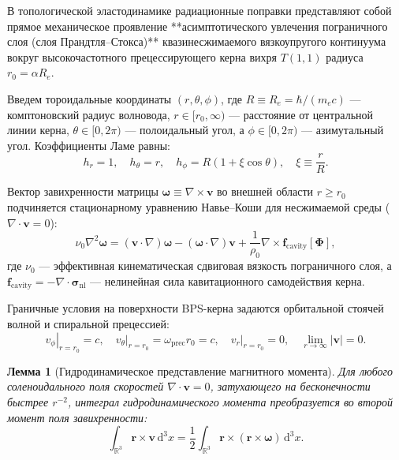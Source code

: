 \documentclass[11pt,a4paper]{article}
\newtheorem{lemma}[theorem]{Лемма}
\theoremstyle{definition}
\theoremstyle{remark}
\begin{document}
В топологической эластодинамике радиационные поправки представляют собой прямое механическое проявление **асимптотического увлечения пограничного слоя (слоя Прандтля--Стокса)** квазинесжимаемого вязкоупругого континуума вокруг высокочастотного прецессирующего керна вихря $T(1,1)$ радиуса $r_0 = \alpha R_e$.

Введем тороидальные координаты $(r, \theta, \phi)$, где $R \equiv R_e = \hbar / (m_e c)$ --- комптоновский радиус волновода, $r \in [r_0, \infty)$ --- расстояние от центральной линии керна, $\theta \in [0, 2\pi)$ --- полоидальный угол, а $\phi \in [0, 2\pi)$ --- азимутальный угол. Коэффициенты Ламе равны:
\begin{equation}
    h_r = 1, \quad h_\theta = r, \quad h_\phi = R(1 + \xi \cos\theta), \quad \xi \equiv \frac{r}{R}.
\end{equation}

Вектор завихренности матрицы $\boldsymbol{\omega} \equiv \nabla \times \mathbf{v}$ во внешней области $r \ge r_0$ подчиняется стационарному уравнению Навье--Коши для несжимаемой среды ($\nabla \cdot \mathbf{v} = 0$):
\begin{equation}
    \nu_0 \nabla^2 \boldsymbol{\omega} = (\mathbf{v} \cdot \nabla)\boldsymbol{\omega} - (\boldsymbol{\omega} \cdot \nabla)\mathbf{v} + \frac{1}{\rho_0} \nabla \times \mathbf{f}_{\mathrm{cavity}}[\boldsymbol{\Phi}],
    \label{eq:vorticity_navier_cauchy}
\end{equation}
где $\nu_0$ --- эффективная кинематическая сдвиговая вязкость пограничного слоя, а $\mathbf{f}_{\mathrm{cavity}} = -\nabla \cdot \boldsymbol{\sigma}_{\mathrm{nl}}$ --- нелинейная сила кавитационного самодействия керна. 

Граничные условия на поверхности BPS-керна задаются орбитальной стоячей волной и спиральной прецессией:
\begin{equation}
    \left. v_\phi \right|_{r = r_0} = c, \quad \left. v_\theta \right|_{r = r_0} = \omega_{\mathrm{prec}} r_0 = c, \quad \left. v_r \right|_{r = r_0} = 0, \quad \lim_{r \to \infty} |\mathbf{v}| = 0.
\end{equation}

\begin{lemma}[Гидродинамическое представление магнитного момента]
Для любого соленоидального поля скоростей $\nabla \cdot \mathbf{v} = 0$, затухающего на бесконечности быстрее $r^{-2}$, интеграл гидродинамического момента преобразуется во второй момент поля завихренности:
\begin{equation}
    \int_{\mathbb{R}^3} \mathbf{r} \times \mathbf{v} \, \mathrm{d}^3 x = \frac{1}{2} \int_{\mathbb{R}^3} \mathbf{r} \times (\mathbf{r} \times \boldsymbol{\omega}) \, \mathrm{d}^3 x.
    \label{eq:lemma_vorticity_moment}
\end{equation}
\end{lemma}
\end{document}
